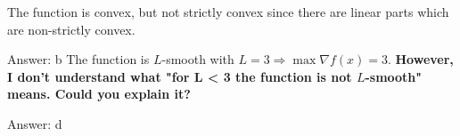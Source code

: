 \documentclass{homework}
\begin{document}
The function is convex, but not strictly convex since there are linear parts which are non-strictly convex.

Answer: b
\exercise*
The function is $L$-smooth with $L=3 \Rightarrow \max\nabla f(x) = 3$. \textbf {However, I don't understand what "for L < 3 the function is not $L$-smooth" means. Could you explain it?}

Answer: d
\end{document}
